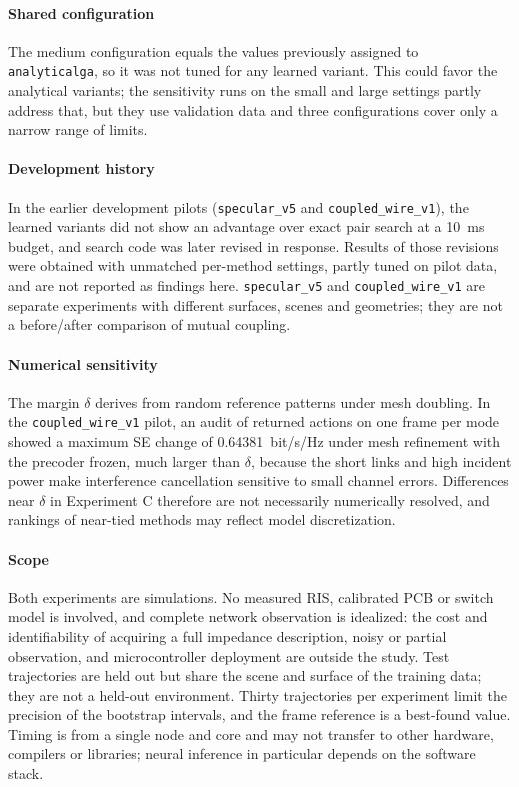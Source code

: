 \documentclass[conference]{IEEEtran}
\newcommand{\mth}[1]{\begingroup\renewcommand{\_}{\textunderscore\allowbreak}\texttt{#1}\endgroup}
\newcommand{\margin}{\delta}
\begin{document}
\paragraph{Shared configuration} The medium configuration equals the values previously assigned to \mth{analytical\_ga}, so it was not tuned for any learned variant. This could favor the analytical variants; the sensitivity runs on the small and large settings partly address that, but they use validation data and three configurations cover only a narrow range of limits.

\paragraph{Development history} In the earlier development pilots (\texttt{specular\_v5} and \texttt{coupled\_wire\_v1}), the learned variants did not show an advantage over exact pair search at a 10~ms budget, and search code was later revised in response. Results of those revisions were obtained with unmatched per-method settings, partly tuned on pilot data, and are not reported as findings here. \texttt{specular\_v5} and \texttt{coupled\_wire\_v1} are separate experiments with different surfaces, scenes and geometries; they are not a before/after comparison of mutual coupling.

\paragraph{Numerical sensitivity} The margin $\margin$ derives from random reference patterns under mesh doubling. In the \texttt{coupled\_wire\_v1} pilot, an audit of returned actions on one frame per mode showed a maximum SE change of 0.64381~bit/s/Hz under mesh refinement with the precoder frozen, much larger than $\margin$, because the short links and high incident power make interference cancellation sensitive to small channel errors. Differences near $\margin$ in Experiment C therefore are not necessarily numerically resolved, and rankings of near-tied methods may reflect model discretization.

\paragraph{Scope} Both experiments are simulations. No measured RIS, calibrated PCB or switch model is involved, and complete network observation is idealized: the cost and identifiability of acquiring a full impedance description, noisy or partial observation, and microcontroller deployment are outside the study. Test trajectories are held out but share the scene and surface of the training data; they are not a held-out environment. Thirty trajectories per experiment limit the precision of the bootstrap intervals, and the frame reference is a best-found value. Timing is from a single node and core and may not transfer to other hardware, compilers or libraries; neural inference in particular depends on the software stack.
\end{document}
